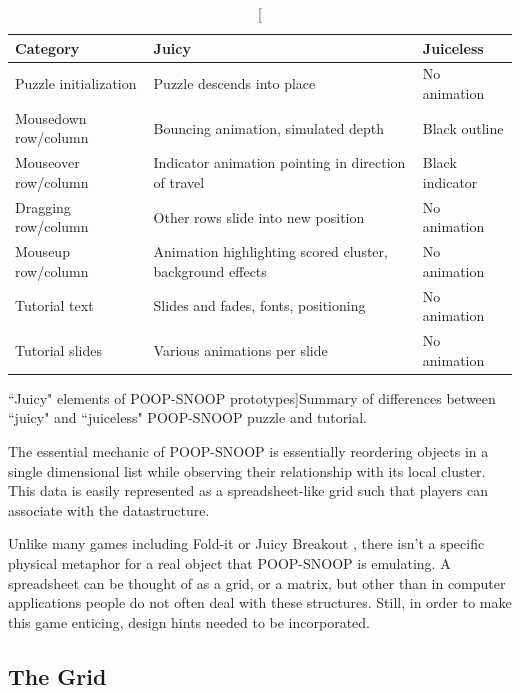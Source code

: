\begin{table}
\begin{center}

\begin{tabular}{|>{\centering}p{3cm}|>{\centering}p{5cm}|>{\centering}p{5cm}|}
\hline 
Category&  Juicy&  Juiceless
\tabularnewline
\hline 

Puzzle initialization&  Puzzle descends into place&  No animation
\tabularnewline
\hline 

Mousedown row/column&  Bouncing animation, simulated depth&  Black outline
\tabularnewline
\hline 

Mouseover row/column&  Indicator animation pointing in direction of travel&  Black indicator
\tabularnewline
\hline 

Dragging row/column&  Other rows slide into new position&  No animation
\tabularnewline
\hline 

Mouseup row/column&  Animation highlighting scored cluster, background effects&  No animation
\tabularnewline
\hline 

Tutorial text&  Slides and fades, fonts, positioning&  No animation
\tabularnewline
\hline

Tutorial slides& Various animations per slide&  No animation
\tabularnewline
\hline

\end{tabular}

\caption[``Juicy" elements of POOP-SNOOP prototypes]{Summary of differences between ``juicy" and ``juiceless" POOP-SNOOP puzzle and tutorial.}
\label{table:juice}
\end{center}
\end{table}

The essential mechanic of POOP-SNOOP is essentially reordering objects in a single dimensional list while observing their relationship with its local cluster. This data is easily represented as a spreadsheet-like grid such that players can associate with the datastructure.

Unlike many games including Fold-it \cite{cooper2010challenge} or Juicy Breakout \cite{juiceitorloseit}, there isn't a specific physical metaphor for a real object that POOP-SNOOP is emulating. A spreadsheet can be thought of as a grid, or a matrix, but other than in computer applications people do not often deal with these structures. Still, in order to make this game enticing, design hints needed to be incorporated.

\subsection{The Grid}


